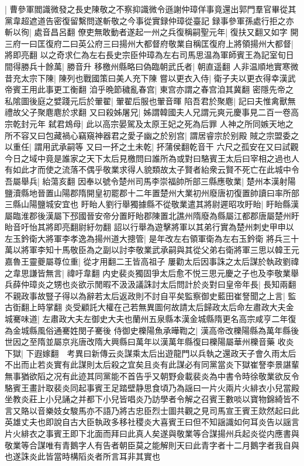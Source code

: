 |{
	曹參軍閻識微發之長史陳敬之不察抑識微令遜謝仲璋佯事竟還出郭門羣官畢從其黨韋超遮道告密復留繫問遂斬敬之今事從實録仲璋從臺記}
録事參軍孫處行拒之亦斬以徇|{
	處音昌呂翻}
僚吏無敢動者遂起一州之兵復稱嗣聖元年|{
	復扶又翻又如字}
開三府一曰匡復府二曰英公府三曰揚州大都督府敬業自稱匡復府上將領揚州大都督|{
	將即亮翻}
以之奇求仁為左右長史宗臣仲璋為左右司馬思温為軍師賓王為記室旬日間得勝兵十餘萬|{
	勝音升}
移檄州縣略曰偽臨朝武氏者|{
	朝直遥翻}
人非温順地實寒微昔充太宗下陳|{
	陳列也戰國策曰美人充下陳}
嘗以更衣入侍|{
	衛子夫以更衣得幸漢武帝賓王用此事更工衡翻}
洎乎晩節穢亂春宫|{
	東宫亦謂之春宫洎其冀翻}
密隱先帝之私隂圖後庭之嬖踐元后於翬翟|{
	翬翟后服也翬音暉}
陷吾君於聚麀|{
	記曰夫惟禽獸無禮故父子聚麀麀於求翻}
又曰殺姊屠兄|{
	姊謂韓國夫人兄謂元爽元慶事見二百一卷高宗乾封元年}
弑君鴆母|{
	此以高宗晏駕及太原王妃之死為后罪}
人神之所同嫉天地之所不容又曰包藏禍心竊窺神器君之愛子幽之於别宫|{
	謂居睿宗於别殿}
賊之宗盟委之以重任|{
	謂用武承嗣等}
又曰一抔之土未乾|{
	抔蒲侯翻乾音干}
六尺之孤安在又曰試觀今日之域中竟是誰家之天下太后見檄問曰誰所為或對曰駱賓王太后曰宰相之過也人有如此才而使之流落不偶乎敬業求得人貌類故太子賢者紿衆云賢不死亡在此城中令吾屬舉兵|{
	紿蕩亥翻}
因奉以號令楚州司馬李崇福帥所部三縣應敬業|{
	楚州本漢射陽鹽瀆縣地晉置山陽郡隋開皇初罷郡十二年置楚州大業初州廢唐初復置帥讀曰率所部三縣山陽鹽城安宜也}
盱眙人劉行舉獨據縣不從敬業遣其將尉遲昭攻盱眙|{
	盱眙縣漢屬臨淮郡後漢屬下邳國晉安帝分置盱眙郡陳置北譙州隋廢為縣屬江都郡唐屬楚州盱眙音吁怡其將即亮翻尉紆勿翻}
詔以行舉為遊擊將軍以其弟行實為楚州刺史甲申以左玉鈐衛大將軍李孝逸為揚州道大摠管|{
	是年改左右領軍衛為左右玉鈐衛}
將兵三十萬以將軍李知十馬敬臣為之副以討李敬業武承嗣與其從父弟右衛將軍三思以韓王元嘉魯王靈夔屬尊位重|{
	從才用翻二王皆高祖子}
屢勸太后因事誅之太后謀於執政劉禕之韋思謙皆無言|{
	禕吁韋翻}
内史裴炎獨固爭太后愈不悦三思元慶之子也及李敬業舉兵薛仲璋炎之甥也炎欲示閒暇不汲汲議誅討太后問計於炎對曰皇帝年長|{
	長知兩翻}
不親政事故豎子得以為辭若太后返政則不討自平矣監察御史藍田崔詧聞之上言|{
	監古衘翻上時掌翻}
炎受顧託大權在己若無異圖何故請太后歸政太后命左肅政大夫金城騫味道|{
	左肅政大夫左御史大夫也蘭州五泉縣本漢金城縣隋更名高宗咸亨二年復為金城縣風俗通騫姓閔子騫後}
侍御史櫟陽魚承曄鞫之|{
	漢高帝改櫟陽縣為萬年縣後世因之至隋並屬京兆唐改隋大興縣曰萬年以漢萬年縣復曰櫟陽屬華州櫟音藥}
收炎下獄|{
	下遐嫁翻　考異曰新傳云炎謀乘太后出遊龍門以兵執之還政天子會久雨太后不出而止若炎實有此謀則太后殺之宜矣且炎有此謀必有同黨當炎下獄崔詧李景諶輩無事猶欲䧟之况有此迹其同黨能不首告乎又朝野僉載裴炎為中書令時徐敬業欲反令駱賓王畫計取裴炎同起事賓王足踏壁静思食頃乃為謡曰一片火兩片火緋衣小兒當殿坐教炎莊上小兒誦之并都下小兒皆唱炎乃訪學者令解之召賓王數啖以寶物錦綺皆不言又賂以音樂妓女駿馬亦不語乃將古忠臣烈士圖共觀之見司馬宣王賓王欻然起曰此英雄丈夫也即說自古大臣執政多移社稷炎大喜賓王曰但不知謡識如何耳炎告以謡言片火緋衣之事賓王即下北面而拜曰此真人矣遂與敬業等合謀揚州兵起炎從内應書與敬業等合謀唯有青鵝字人有告者朝臣莫之能解則天曰此青字者十二月鵝字者我自與也遂誅炎此皆當時構䧟炎者所言耳非其實也}
